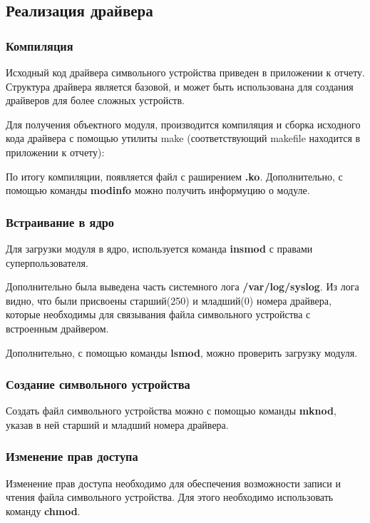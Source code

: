 \subsection{Реализация драйвера}
\subsubsection{Компиляция}
Исходный код драйвера символьного устройства приведен в приложении к отчету. Структура драйвера является базовой, и может быть использована для создания драйверов для более сложных устройств.

Для получения объектного модуля, производится компиляция и  сборка исходного кода драйвера с помощью утилиты make (соответствующий makefile находится в приложении к отчету):

По итогу компиляции, появляется файл с раширением \textbf{.ko}. Дополнительно, с помощью команды \textbf{modinfo} можно получить информуцию о модуле.



\subsubsection{Встраивание в ядро}
Для загрузки модуля в ядро, используется команда \textbf{insmod} с правами суперпользователя. 

Дополнительно была выведена часть системного лога \textbf{/var/log/syslog}. Из лога видно, что были присвоены старший(250) и младший(0) номера драйвера, которые необходимы для связывания файла символьного устройства с встроенным драйвером.

Дополнительно, с помощью команды \textbf{lsmod}, можно проверить загрузку модуля.



\subsubsection{Создание символьного устройства}
Создать файл символьного устройства можно с помощью команды \textbf{mknod}, указав в ней старший и младший номера драйвера. 



\subsubsection{Изменение прав доступа}
Изменение прав доступа необходимо для обеспечения возможности записи и чтения файла символьного устройства. Для этого необходимо использовать команду \textbf{chmod}.



